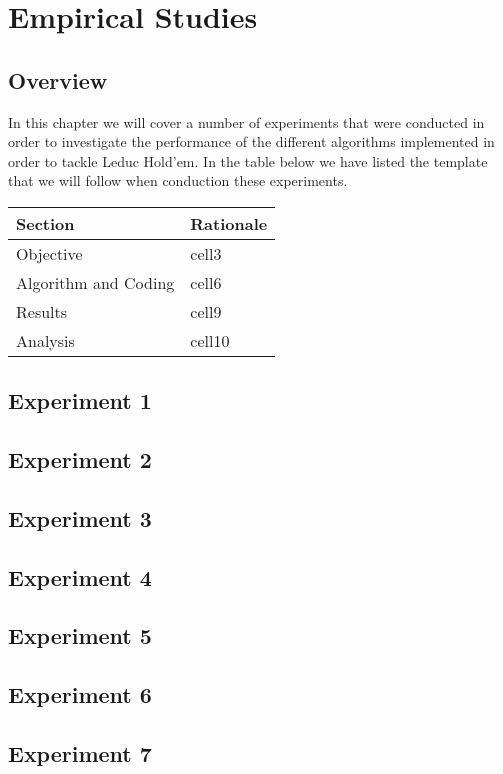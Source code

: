 
\chapter{Empirical Studies}\label{ch:empirical}

\section{Overview}\label{sec:empOverview}
In this chapter we will cover a number of experiments that were conducted in order to investigate
the performance of the different algorithms implemented in order to tackle Leduc Hold'em.
In the table below we have listed the template that we will follow when conduction these experiments.


\begin{tabular}{ | p{2cm} | p{10cm} | }
    \hline
    \textbf{Section} & \textbf{Rationale} \\
    \hline
    Objective & cell3 \\
    \hline
    Algorithm and Coding & cell6 \\
    \hline
    Results & cell9 \\
    \hline
    Analysis & cell10 \\
    \hline
\end{tabular}

\section{Experiment 1}\label{sec:expmeriment1}

\section{Experiment 2} \label{sec:experiment2}

\section{Experiment 3}\label{sec:experiment3}

\section{Experiment 4} \label{sec:experiment4}

\section{Experiment 5} \label{sec:experiment5}

\section{Experiment 6} \label{sec:experiment6}

\section{Experiment 7} \label{sec:experiment7}
